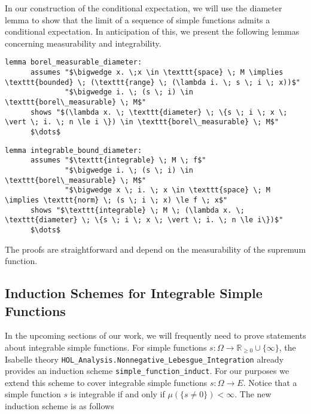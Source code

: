 In our construction of the conditional expectation, we will use the diameter lemma to show that the limit of a sequence of simple functions admits a conditional expectation. In anticipation of this, we present the following lemmas concerning measurability and integrability.

\begin{isalemma}
{\small
	\begin{lstlisting}[style=isabelle]
	lemma borel_measurable_diameter: 
	  assumes "$\bigwedge x. \;x \in \texttt{space} \; M \implies \texttt{bounded} \; (\texttt{range} \; (\lambda i. \; s \; i \; x))$"
			  "$\bigwedge i. \; (s \; i) \in \texttt{borel\_measurable} \; M$"
	  shows "$(\lambda x. \; \texttt{diameter} \; \{s \; i \; x \; \vert \; i. \; n \le i \}) \in \texttt{borel\_measurable} \; M$"
	  $\dots$
  	\end{lstlisting}
}
\end{isalemma}

\begin{isalemma}
{\small
	\begin{lstlisting}[style=isabelle]
	lemma integrable_bound_diameter: 
	  assumes "$\texttt{integrable} \; M \; f$" 
			  "$\bigwedge i. \; (s \; i) \in \texttt{borel\_measurable} \; M$"
			  "$\bigwedge x \; i. \; x \in \texttt{space} \; M \implies \texttt{norm} \; (s \; i \; x) \le f \; x$"
	  shows "$\texttt{integrable} \; M \; (\lambda x. \; \texttt{diameter} \; \{s \; i \; x \; \vert \; i. \; n \le i\})$"
	  $\dots$
  	\end{lstlisting}
}
\end{isalemma}

The proofs are straightforward and depend on the measurability of the supremum function.

\subsection{Induction Schemes for Integrable Simple Functions}

In the upcoming sections of our work, we will frequently need to prove statements about integrable simple functions. For simple functions $s : \Omega \rightarrow \mathbb{R}_{\ge 0} \cup \{\infty\}$, the Isabelle theory \texttt{HOL\_Analysis.Nonnegative\_Lebesgue\_Integration} already provides an induction scheme \texttt{simple\_function\_induct}. For our purposes we extend this scheme to cover integrable simple functions $s : \Omega \rightarrow E$. Notice that a simple function $s$ is integrable if and only if $\mu(\{s \neq 0\}) < \infty$. The new induction scheme is as follows

